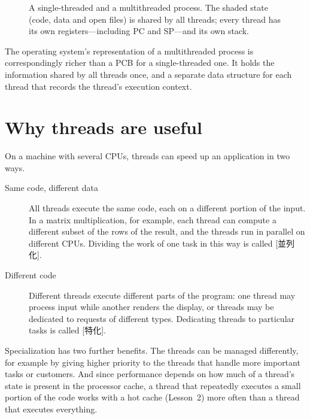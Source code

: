 \documentclass[../main.tex]{subfiles}
\begin{document}
\begin{figure}[htbp]
  \centering
  
  \caption{A single-threaded and a multithreaded process.  The shaded state
    (code, data and open files) is shared by all threads; every thread has
    its own registers---including PC and SP---and its own stack.}
  \label{fig:l03-process-thread}
\end{figure}

The operating system's representation of a multithreaded process is
correspondingly richer than a PCB for a single-threaded one.  It holds the
information shared by all threads once, and a separate data structure for
each thread that records the thread's execution context.

\section{Why threads are useful}
\label{sec:l03-benefits}

On a machine with several CPUs, threads can speed up an application in two
ways.

\begin{description}
  \item[Same code, different data] All threads execute the same code, each
    on a different portion of the input.  In a matrix multiplication, for
    example, each thread can compute a different subset of the rows of the
    result, and the threads run in parallel on different CPUs.  Dividing the
    work of one task in this way is called
    [並列化].
  \item[Different code] Different threads execute different parts of the
    program: one thread may process input while another renders the
    display, or threads may be dedicated to requests of different types.
    Dedicating threads to particular tasks is called
    [特化].
\end{description}

Specialization has two further benefits.  The threads can be managed
differently, for example by giving higher priority to the threads that
handle more important tasks or customers.  And since performance depends on
how much of a thread's state is present in the processor cache, a thread
that repeatedly executes a small portion of the code works with a hot cache
(Lesson~2) more often than a thread that executes everything.
\end{document}

